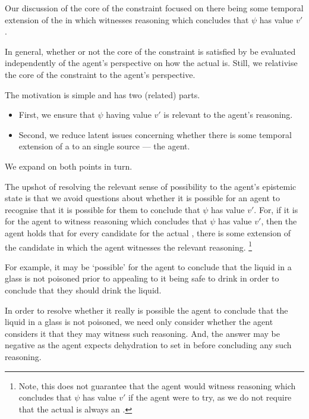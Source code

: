 \begin{note}
  Our discussion of the core of the constraint focused on there being some temporal extension of the \world{} in which \vAgent{} witnesses reasoning which concludes that \(\psi\) has value \(v'\).

  In general, whether or not the core of the constraint is satisfied by be evaluated independently of the agent's perspective on how the actual \world{} is.
  Still, we relativise the core of the constraint to the agent's perspective.

  The motivation is simple and has two (related) parts.
  \begin{itemize}
  \item
    First, we ensure that \(\psi\) having value \(v'\) is relevant to the agent's reasoning.
  \item
    Second, we reduce latent issues concerning whether there is some temporal extension of a \world{} to an single source --- the agent.
  \end{itemize}
  We expand on both points in turn.
\end{note}


\begin{note}
  The upshot of resolving the relevant sense of possibility to the agent's epistemic state is that we avoid questions about whether it is possible for an agent to recognise that it is possible for them to conclude that \(\psi\) has value \(v'\).
  For, if it is \epVAd{} for the agent to witness reasoning which concludes that \(\psi\) has value \(v'\), then the agent holds that for every candidate for the actual \world{}, there is some extension of the candidate \world{} in which the agent witnesses the relevant reasoning.\nolinebreak
  \footnote{
    Note, this does not guarantee that the agent would witness reasoning which concludes that \(\psi\) has value \(v'\) if the agent were to try, as we do not require that the actual \world{} is always an \epVW{}.
  }

  For example, it may be `possible' for the agent to conclude that the liquid in a glass is not poisoned prior to appealing to it being safe to drink in order to conclude that they should drink the liquid.

  In order to resolve whether it really is possible the agent to conclude that the liquid in a glass is not poisoned, we need only consider whether the agent considers it \epVAd{} that they may witness such reasoning.
  And, the answer may be negative as the agent expects dehydration to set in before concluding any such reasoning.
\end{note}

